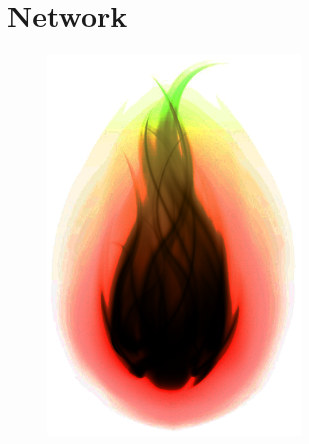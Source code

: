 \documentclass[12pt]{report}
\begin{document}
\section{Network}

\cleardoublepage

\thispagestyle{empty}

\vspace*{\fill}

\begin{figure}[h]
    \centering
    \includegraphics[width=0.6\textwidth]{fireball}
\end{figure}

\vfill
\end{document}
